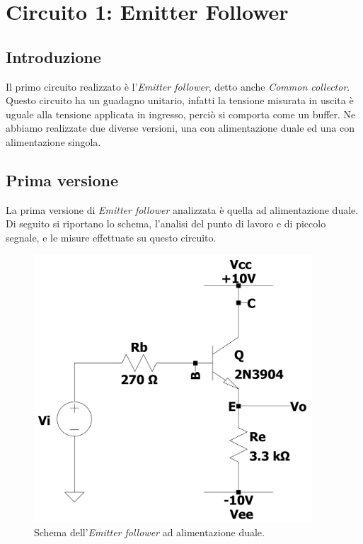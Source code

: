 \documentclass{report}
\begin{document}
\chapter{Circuito 1: Emitter Follower}
\section{Introduzione} 
Il primo circuito realizzato è l'\textit{Emitter follower}, detto anche \textit{Common collector}. Questo circuito ha un guadagno unitario, infatti la tensione misurata in uscita è uguale alla tensione applicata in ingresso, perciò si comporta come un buffer. Ne abbiamo realizzate due diverse versioni, una con alimentazione duale ed una con alimentazione singola. 
\section{Prima versione} %
La prima versione di \textit{Emitter follower} analizzata è quella ad alimentazione duale. Di seguito si riportano lo schema, l'analisi del punto di lavoro e di piccolo segnale, e le misure effettuate su questo circuito. 
\begin{figure}[h]
\centering
\includegraphics[height=10cm]{immagini/EFv1}
\caption{Schema dell'\textit{Emitter follower} ad alimentazione duale.}
\end{figure}
\end{document}
